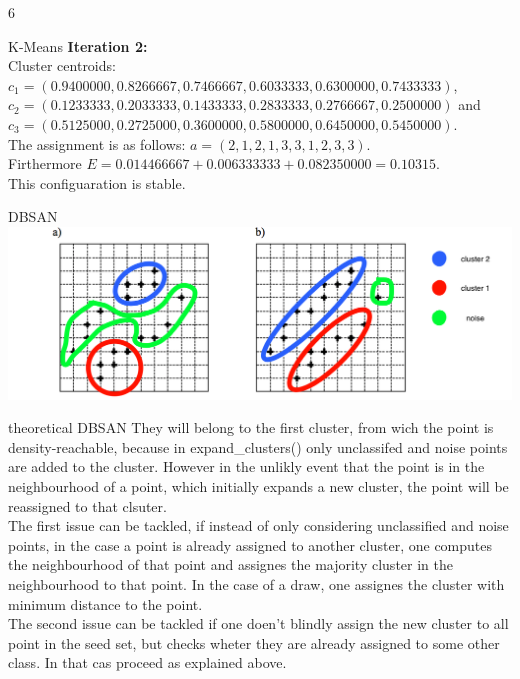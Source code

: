 \documentclass{article}
\begin{document}
\begin{ukon-infie}[5.12.17]{6}
\begin{exercise}[p=10]{K-Means}
		\textbf{Iteration 2:} \\
		Cluster centroids: \\
		$c_1 = (0.9400000, 0.8266667, 0.7466667, 0.6033333, 0.6300000, 0.7433333)$, \\
		 $c_2 = (0.1233333, 0.2033333, 0.1433333, 0.2833333, 0.2766667, 0.2500000)$ and \\
		 $c_3 = (0.5125000, 0.2725000, 0.3600000, 0.5800000, 0.6450000, 0.5450000)$.\\
		The assignment is as follows: $a = (2, 1, 2, 1, 3, 3, 1, 2, 3, 3)$.\\
		Firthermore $E = 0.014466667 + 0.006333333 + 0.082350000 = 0.10315$.\\
		
		This configuaration is stable.
		
		\end{exercise}
		
		


		\begin{exercise}[p=6]{DBSAN}
		{
		\includegraphics[scale=0.4]{dbscan.png}
		}
	
		\end{exercise}
		
		\begin{exercise}[p=3]{theoretical DBSAN}
		{
		They will belong to the first cluster, from wich the point is density-reachable, because in expand\_clusters() only unclassifed and noise points are added to the cluster. However in the unlikly event that the point is in the neighbourhood of a point, which initially expands a new cluster, the point will be reassigned to that clsuter.\\
		
		The first issue can be tackled, if instead of only considering unclassified and noise points, in the case a point is already assigned to another cluster, one computes the neighbourhood of that point and assignes the majority cluster in the neighbourhood to that point. In the case of a draw, one assignes the cluster with minimum distance to the point.\\
		
		The second issue can be tackled if one doen't blindly assign the new cluster to all point in the seed set, but checks wheter they are already assigned to some other class. In that cas proceed as explained above.
		}
	
		\end{exercise}
		
		
\end{ukon-infie}
\end{document}
